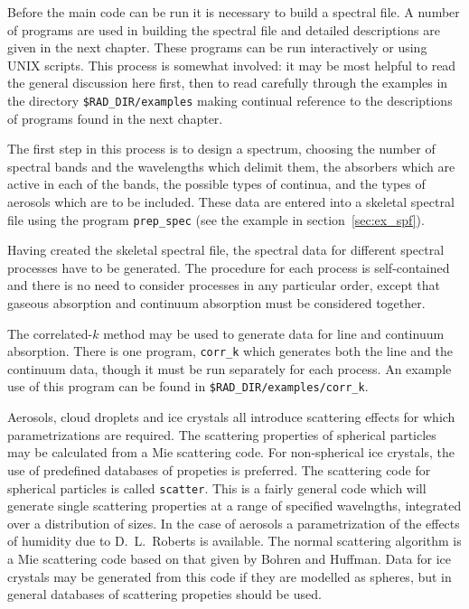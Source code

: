 
Before the main code can be run it is necessary to build a spectral file.
A number of programs are used in building the spectral file and detailed
descriptions are given in the next chapter. These programs can be run 
interactively or using UNIX scripts. This process is somewhat involved:
it may be most helpful to read the general discussion here first, then to
read carefully through the examples in the directory {\tt \$RAD\_DIR/examples}
making continual reference to the descriptions of programs found in the next
chapter.

The first step in this process is to design a spectrum, choosing the number
of spectral bands and the wavelengths which delimit them, the absorbers
which are active in each of the bands, the possible types of continua, and
the types of aerosols which are to be included. These data are entered into a 
skeletal spectral file using the program {\tt prep\_spec} (see the example
in section~\ref{sec:ex_spf}).

Having created the skeletal spectral file, the spectral data for 
different spectral
processes have to be generated. The procedure for each process is
self-contained and there is no need to consider processes in any particular
order, except that gaseous absorption and continuum absorption must
be considered together.

The correlated-$k$ method may be used to
generate data for line and continuum absorption. There is one program, 
{\tt corr\_k} which generates both the line and the continuum data, though
it must be run separately for each process. An example use of this
program can be found in {\tt \$RAD\_DIR/examples/corr\_k}.

Aerosols, cloud droplets and ice crystals all introduce scattering effects
for which 
parametrizations are required. The scattering properties of spherical
particles may be calculated from a Mie scattering code. For non-spherical
ice crystals, the use of predefined databases of propeties is preferred.
The scattering code for spherical particles is called {\tt scatter}. This
is a fairly general code which will generate single scattering properties at
a range of specified wavelngths, integrated over a distribution of sizes.
In the case of aerosols a parametrization of the effects of humidity due
to D.~L.~Roberts is available. The normal scattering algorithm is a Mie
scattering code based on that given by Bohren and Huffman. Data for ice
crystals may be generated from this code if they are modelled as spheres,
but in general databases of scattering propeties should be used.

